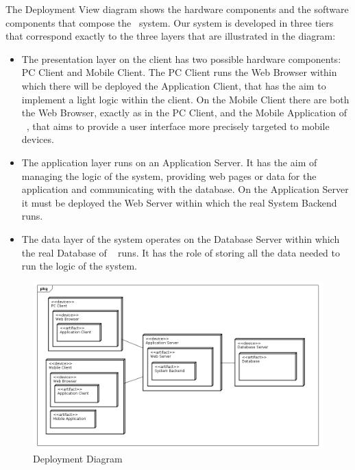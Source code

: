 The Deployment View diagram shows the hardware components and the software components that compose the \projectname~system. Our system is developed in three tiers that correspond exactly to the three layers that are illustrated in the diagram:
\begin{itemize}
	\item The presentation layer on the client has two possible hardware components: PC Client and Mobile Client. The PC Client runs the Web Browser within which there will be deployed the Application Client, that has the aim to implement a light logic within the client. On the Mobile Client there are both the Web Browser, exactly as in the PC Client, and the Mobile Application of \projectname~, that aims to provide a user interface more precisely targeted to mobile devices.
	\item The application layer runs on an Application Server. It has the aim of managing the logic of the system, providing web pages or data for the application and communicating with the database. On the Application Server it must be deployed the Web Server within which the real System Backend runs.
	\item The data layer of the system operates on the Database Server within which the real Database of \projectname~ runs. It has the role of storing all the data needed to run the logic of the system.
\end{itemize}

\begin{figure}[h]
\centering\includegraphics[width=\textwidth]{Images/UMLDiagrams/DeploymentDiagram.png}
\caption{Deployment Diagram}
\end{figure}

\clearpage